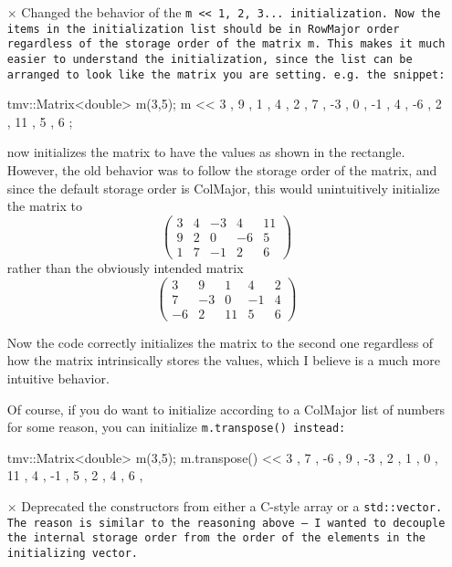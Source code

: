 \begin{itemize}

\item[$\times$] 
Changed the behavior of the \tt{m << 1, 2, 3...} initialization.  Now the items in the initialization list should be in RowMajor order regardless of the storage order of the matrix \tt{m}.  This makes it much easier to understand the initialization, since the list can be arranged to look like the matrix you are setting.  e.g. the snippet:
\begin{tmvcode}
tmv::Matrix<double> m(3,5);
m << 3 ,  9 ,  1 ,  4 ,  2 ,
     7 , -3 ,  0 , -1 ,  4 ,
    -6 ,  2 , 11 ,  5 ,  6 ;
\end{tmvcode}
now initializes the matrix to have the values as shown in the rectangle.  However, the old behavior was to follow the storage order of the matrix, and since the default storage order is ColMajor, this would unintuitively initialize the matrix to
\begin{equation*}
\left(\begin{array}{ccccc}3 & 4 & -3 & 4 & 11   \\9 & 2 & 0 & -6 & 5   \\1 & 7 & -1 & 2 & 6 \end{array}\right) 
\end{equation*}
rather than the obviously intended matrix
\begin{equation*}
\left(\begin{array}{ccccc}3 & 9 & 1 & 4 & 2   \\7 & -3 & 0 & -1 & 4   \\-6 & 2 & 11 & 5 & 6 \end{array}\right) 
\end{equation*}

Now the code correctly initializes the matrix to the second one regardless of how the matrix intrinsically stores the values, which I believe is a much more intuitive behavior.

Of course, if you do want to initialize according to a ColMajor list of numbers for some reason, you can initialize \tt{m.transpose()} instead:
\begin{tmvcode}
tmv::Matrix<double> m(3,5);
m.transpose() << 3 ,  7 , -6 ,
                 9 , -3 ,  2 ,
                 1 ,  0 , 11 ,
                 4 , -1 ,  5 ,
                 2 ,  4 ,  6 ,
\end{tmvcode}

\item[$\times$] 
Deprecated the constructors from either a C-style array or a \tt{std::vector}.  The reason is similar to the reasoning above -- I wanted to decouple the internal storage order from the order of the elements in the initializing vector. 


\end{itemize}
